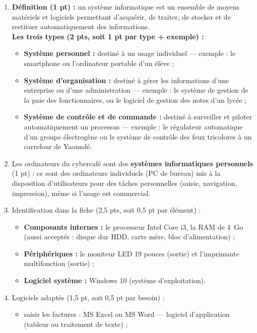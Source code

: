 \documentclass[11pt]{article}
\begin{document}
\begin{corrige}
\begin{enumerate}
\item \textbf{Définition (1 pt) :} un système informatique est un ensemble de moyens matériels et logiciels permettant d'acquérir, de traiter, de stocker et de restituer automatiquement des informations.\\
\textbf{Les trois types (2 pts, soit 1 pt par type + exemple) :}
\begin{itemize}
\item \textbf{Système personnel :} destiné à un usage individuel — exemple : le smartphone ou l'ordinateur portable d'un élève ;
\item \textbf{Système d'organisation :} destiné à gérer les informations d'une entreprise ou d'une administration — exemple : le système de gestion de la paie des fonctionnaires, ou le logiciel de gestion des notes d'un lycée ;
\item \textbf{Système de contrôle et de commande :} destiné à surveiller et piloter automatiquement un processus — exemple : le régulateur automatique d'un groupe électrogène ou le système de contrôle des feux tricolores à un carrefour de Yaoundé.
\end{itemize}
\item Les ordinateurs du cybercafé sont des \textbf{systèmes informatiques personnels} (1 pt) : ce sont des ordinateurs individuels (PC de bureau) mis à la disposition d'utilisateurs pour des tâches personnelles (saisie, navigation, impression), même si l'usage est commercial.
\item Identification dans la fiche (2,5 pts, soit 0,5 pt par élément) :
\begin{itemize}
\item \textbf{Composants internes :} le processeur Intel Core i3, la RAM de \SI{4}{Go} (aussi acceptés : disque dur HDD, carte mère, bloc d'alimentation) ;
\item \textbf{Périphériques :} le moniteur LED 19 pouces (sortie) et l'imprimante multifonction (sortie) ;
\item \textbf{Logiciel système :} Windows 10 (système d'exploitation).
\end{itemize}
\item Logiciels adaptés (1,5 pt, soit 0,5 pt par besoin) :
\begin{itemize}
\item saisir les factures : MS Excel ou MS Word — logiciel d'application (tableur ou traitement de texte) ;

\end{itemize}
\end{enumerate}
\end{corrige}
\end{document}
